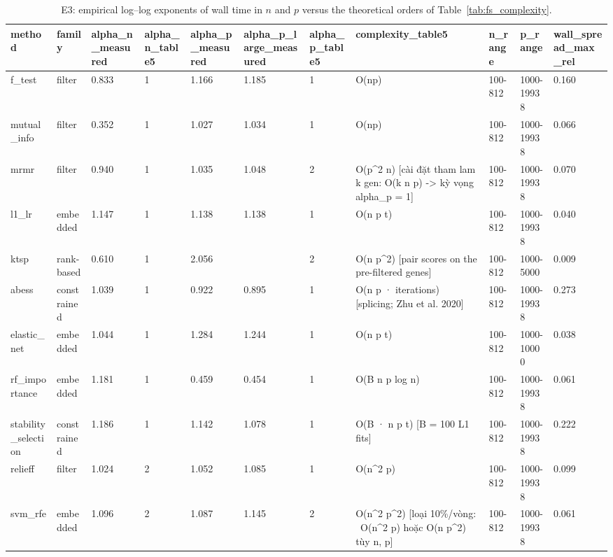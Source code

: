 \begin{table}[t]
  \centering
  \caption{E3: empirical log--log exponents of wall time in $n$ and $p$ versus the theoretical orders of Table~\ref{tab:fs_complexity}.}
  \label{tab:e3_exponents}
  \small
  \begin{tabular}{lllllllllll}
    \toprule
    method & family & alpha\_n\_measured & alpha\_n\_table5 & alpha\_p\_measured & alpha\_p\_large\_measured & alpha\_p\_table5 & complexity\_table5 & n\_range & p\_range & wall\_spread\_max\_rel \\
    \midrule
    f\_test & filter & 0.833 & 1 & 1.166 & 1.185 & 1 & O(np) & 100-812 & 1000-19938 & 0.160 \\
    mutual\_info & filter & 0.352 & 1 & 1.027 & 1.034 & 1 & O(np) & 100-812 & 1000-19938 & 0.066 \\
    mrmr & filter & 0.940 & 1 & 1.035 & 1.048 & 2 & O(p^2 n) [cài đặt tham lam k gen: O(k n p) -> kỳ vọng alpha\_p = 1] & 100-812 & 1000-19938 & 0.070 \\
    l1\_lr & embedded & 1.147 & 1 & 1.138 & 1.138 & 1 & O(n p t) & 100-812 & 1000-19938 & 0.040 \\
    ktsp & rank-based & 0.610 & 1 & 2.056 &  & 2 & O(n p^2) [pair scores on the pre-filtered genes] & 100-812 & 1000-5000 & 0.009 \\
    abess & constrained & 1.039 & 1 & 0.922 & 0.895 & 1 & O(n p · iterations) [splicing; Zhu et al. 2020] & 100-812 & 1000-19938 & 0.273 \\
    elastic\_net & embedded & 1.044 & 1 & 1.284 & 1.244 & 1 & O(n p t) & 100-812 & 1000-10000 & 0.038 \\
    rf\_importance & embedded & 1.181 & 1 & 0.459 & 0.454 & 1 & O(B n p log n) & 100-812 & 1000-19938 & 0.061 \\
    stability\_selection & constrained & 1.186 & 1 & 1.142 & 1.078 & 1 & O(B · n p t) [B = 100 L1 fits] & 100-812 & 1000-19938 & 0.222 \\
    relieff & filter & 1.024 & 2 & 1.052 & 1.085 & 1 & O(n^2 p) & 100-812 & 1000-19938 & 0.099 \\
    svm\_rfe & embedded & 1.096 & 2 & 1.087 & 1.145 & 2 & O(n^2 p^2) [loại 10\%/vòng: ~O(n^2 p) hoặc O(n p^2) tùy n, p] & 100-812 & 1000-19938 & 0.061 \\
    \bottomrule
  \end{tabular}
\end{table}
